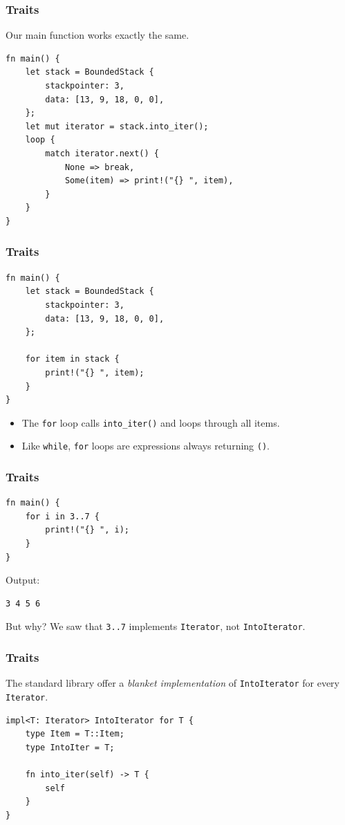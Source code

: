 \begin{frame}[fragile]
    \frametitle{Traits}
    Our main function works exactly the same.
    \vfill
    \begin{verbatim}
fn main() {
    let stack = BoundedStack {
        stackpointer: 3,
        data: [13, 9, 18, 0, 0],
    };
    let mut iterator = stack.into_iter();
    loop {
        match iterator.next() {
            None => break,
            Some(item) => print!("{} ", item),
        }
    }
}
    \end{verbatim}
\end{frame}

\begin{frame}[fragile]
    \frametitle{Traits}
    \begin{verbatim}
fn main() {
    let stack = BoundedStack {
        stackpointer: 3,
        data: [13, 9, 18, 0, 0],
    };

    for item in stack {
        print!("{} ", item);
    }
}
    \end{verbatim}
    \pause
    \vfill
    \begin{itemize}
        \item The \texttt{for} loop calls \texttt{into\_iter()} and loops through all items.
        \item Like \texttt{while}, \texttt{for} loops are expressions always returning \texttt{()}.
    \end{itemize}
\end{frame}

\begin{frame}[fragile]
    \frametitle{Traits}
    \begin{verbatim}
fn main() {
    for i in 3..7 {
        print!("{} ", i);
    }
}
    \end{verbatim}
    \vfill
    Output:
    \pause
    \begin{verbatim}
3 4 5 6
    \end{verbatim}
    \pause
    \vfill
    But why? We saw that \texttt{3..7} implements \texttt{Iterator}, not \texttt{IntoIterator}.
\end{frame}

\begin{frame}[fragile]
    \frametitle{Traits}
    The standard library offer a \textit{blanket implementation} of \texttt{IntoIterator} for every \texttt{Iterator}.
    \pause
    \vfill
    \begin{verbatim}
impl<T: Iterator> IntoIterator for T {
    type Item = T::Item;
    type IntoIter = T;

    fn into_iter(self) -> T {
        self
    }
}
    \end{verbatim}
\end{frame}

